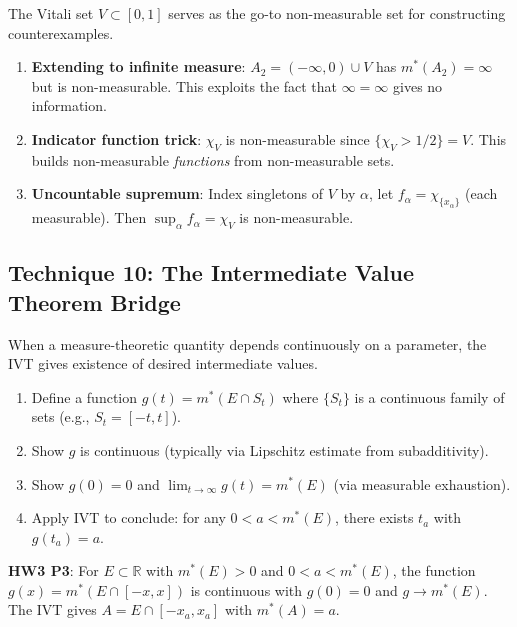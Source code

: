 \documentclass[11pt]{report}
\begin{document}
The Vitali set $V \subset [0,1]$ serves as the go-to non-measurable set for constructing counterexamples.

\begin{rembox}[Strategy]
\begin{enumerate}[label=(\roman*)]
\item \textbf{Extending to infinite measure}: $A_2 = (-\infty, 0) \cup V$ has $m^*(A_2) = \infty$ but is non-measurable. This exploits the fact that $\infty = \infty$ gives no information.
\item \textbf{Indicator function trick}: $\chi_V$ is non-measurable since $\{\chi_V > 1/2\} = V$. This builds non-measurable \textit{functions} from non-measurable sets.
\item \textbf{Uncountable supremum}: Index singletons of $V$ by $\alpha$, let $f_\alpha = \chi_{\{x_\alpha\}}$ (each measurable). Then $\sup_\alpha f_\alpha = \chi_V$ is non-measurable.
\end{enumerate}
\end{rembox}

\subsection{Technique 10: The Intermediate Value Theorem Bridge}

When a measure-theoretic quantity depends continuously on a parameter, the IVT gives existence of desired intermediate values.

\begin{rembox}[Strategy]
\begin{enumerate}[label=(\roman*)]
\item Define a function $g(t) = m^*(E \cap S_t)$ where $\{S_t\}$ is a continuous family of sets (e.g., $S_t = [-t, t]$).
\item Show $g$ is continuous (typically via Lipschitz estimate from subadditivity).
\item Show $g(0) = 0$ and $\lim_{t \to \infty} g(t) = m^*(E)$ (via measurable exhaustion).
\item Apply IVT to conclude: for any $0 < a < m^*(E)$, there exists $t_a$ with $g(t_a) = a$.
\end{enumerate}
\end{rembox}

\begin{exbox}[Application (HW3)]
\textbf{HW3 P3}: For $E \subset \mathbb{R}$ with $m^*(E) > 0$ and $0 < a < m^*(E)$, the function $g(x) = m^*(E \cap [-x,x])$ is continuous with $g(0) = 0$ and $g \to m^*(E)$. The IVT gives $A = E \cap [-x_a, x_a]$ with $m^*(A) = a$.
\end{exbox}
\end{document}
